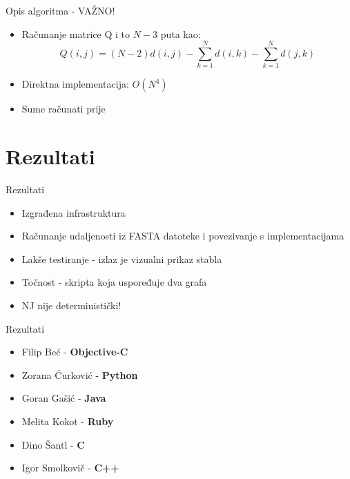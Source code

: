\documentclass[utf8]{beamer}
\begin{document}
\begin{frame}{Opis algoritma - VAŽNO!}
\begin{itemize}
\item Računanje matrice Q i to $N-3$ puta kao: 
$$ Q(i,j) = (N-2) d(i,j) - \sum_{k=1}^{N}d(i,k) - \sum_{k=1}^{N}d(j,k) $$
\item Direktna implementacija: $O(N^4)$
\item Sume računati prije
\end{itemize}
\end{frame}


\section{Rezultati}
\begin{frame}{Rezultati}
\begin{itemize}
	\item Izgrađena infrastruktura
	\item Računanje udaljenosti iz FASTA datoteke i povezivanje s implementacijama
	\item Lakše testiranje - izlaz je vizualni prikaz stabla
	\item Točnost - skripta koja uspoređuje dva grafa
	\item NJ nije deterministički!
\end{itemize}
\end{frame}

\begin{frame}{Rezultati}
\begin{itemize}
	\item Filip Beć - \textbf{Objective-C}
	\item Zorana Ćurković - \textbf{Python}
	\item Goran Gašić - \textbf{Java}
	\item Melita Kokot - \textbf{Ruby}
	\item Dino Šantl - \textbf{C}
	\item Igor Smolkovič - \textbf{C++}
\end{itemize}
\end{frame}
\end{document}

